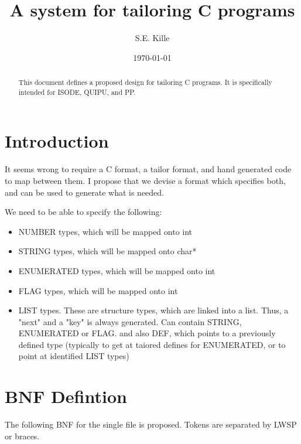 \author {S.E. Kille}
\date {\today}
\title {A system for tailoring C programs}



\maketitle

\begin {abstract}
This document defines a proposed design for tailoring C programs.
It is specifically intended for ISODE, QUIPU, and PP.
\end {abstract}


\section {Introduction}


It seems wrong to require a C format, a tailor format, and hand generated
code to map between them.  I propose that we devise a format which specifies
both, and can be used to generate what is needed. 


We need to be able to specify the following:

\begin {itemize}
\item
NUMBER types, which will be mapped onto int

\item STRING types, which will be mapped onto char*

\item ENUMERATED types, which will be mapped onto int

\item FLAG types, which will be mapped onto int

\item LIST types. These are structure types, which are linked into a list.
Thus, a "next" and a "key" is always generated.  
Can contain STRING, ENUMERATED or FLAG.
and also DEF, which points to a previously defined type (typically to get at 
taiored defines for ENUMERATED, or to point at identified LIST types)

\end {itemize}

\section {BNF Defintion}

The following BNF for the single file is proposed.  Tokens are separated by
LWSP or braces.

